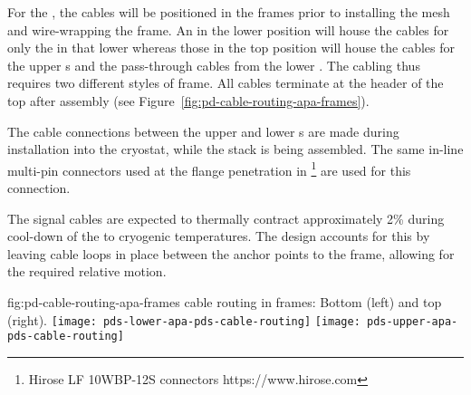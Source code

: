 For the , the  cables will be %
positioned in the  frames prior to installing the %
mesh and wire-wrapping the frame.  %
An  in the lower position will house the cables for only the  in that lower  whereas those in the top position will house the cables for the upper  s and the pass-through cables from the lower . The cabling thus requires two different styles of  frame. All cables terminate at the header of the top  after assembly (see Figure~\ref{fig:pd-cable-routing-apa-frames}).

The cable connections between the upper and lower s are made during  installation into the cryostat, while the  stack is being assembled. The same in-line multi-pin connectors used at the flange penetration in \footnote{Hirose LF 10WBP-12S connectors https://www.hirose.com} are used for this connection.

The  signal cables are expected to thermally contract approximately 2\% during cool-down of the  to cryogenic temperatures.  The design accounts for this by leaving cable loops in place between the anchor points to the  frame, allowing for the required relative motion.


\begin{dunefigure}
{fig:pd-cable-routing-apa-frames}
{ cable routing in  frames: Bottom  (left) and top  (right).}
	\texttt{[image: pds-lower-apa-pds-cable-routing]}
	\texttt{[image: pds-upper-apa-pds-cable-routing]}
	\vspace{-1.5cm}
\end{dunefigure}

